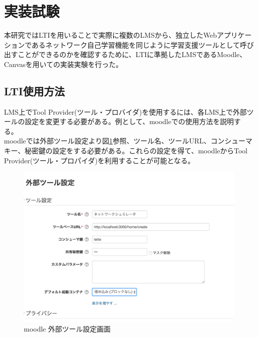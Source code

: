\section{実装試験}
\label{tag:experiment}
本研究ではLTIを用いることで実際に複数のLMSから、独立したWebアプリケーションであるネットワーク自己学習機能を同じように学習支援ツールとして呼び出すことができるのかを確認するために、LTIに準拠したLMSであるMoodle、Canvasを用いての実装実験を行った。\\

\subsection{LTI使用方法}
LMS上でTool Provider(ツール・プロバイダ)を使用するには、各LMS上で外部ツールの設定を変更する必要がある。例として、moodleでの使用方法を説明する。\\
moodleでは外部ツール設定より図\ref{fig:moodle config}参照、ツール名、ツールURL、コンシューマキー、秘密鍵の設定をする必要がある。これらの設定を得て、moodleからTool Provider(ツール・プロパイダ)を利用することが可能となる。\\
\begin{figure}[htbp]
  \begin{center}
    \includegraphics[scale=0.3]{img/moodleSet.png}
    \caption{moodle 外部ツール設定画面}
    \label{fig:moodle config}
  \end{center}
\end{figure}

